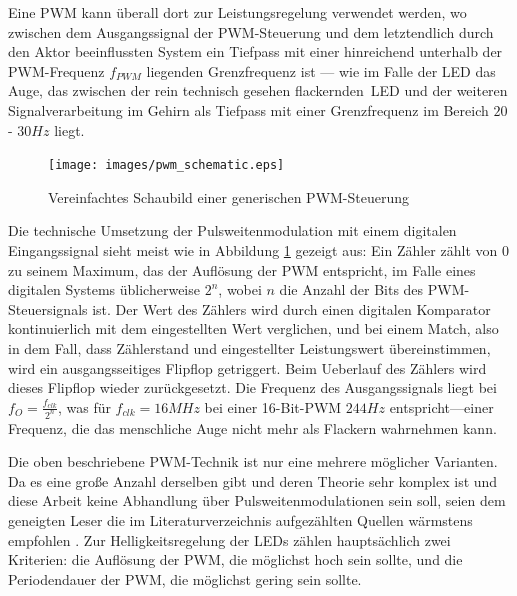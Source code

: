 \documentclass[12pt,a4paper,notitlepage]{article}
\begin{document}
Eine \gls{PWM} kann überall dort zur Leistungsregelung verwendet werden, wo zwischen dem Ausgangssignal der \gls{PWM}-Steuerung und dem letztendlich durch den Aktor beeinflussten System ein Tiefpass mit einer hinreichend unterhalb der PWM-Frequenz $f_{PWM}$ liegenden Grenzfrequenz ist --- wie im Falle der \gls{LED} das Auge, das zwischen der rein technisch gesehen \glqq flackernden\grqq\ \gls{LED} und der weiteren Signalverarbeitung im Gehirn als Tiefpass mit einer Grenzfrequenz im Bereich $20$ - $30Hz$ liegt.

\begin{figure}
\centering
\texttt{[image: images/pwm\_schematic.eps]}
\caption{Vereinfachtes Schaubild einer generischen PWM-Steuerung}
\label{pwm_schematic}
\end{figure}

Die technische Umsetzung der Pulsweitenmodulation mit einem digitalen Eingangssignal sieht meist wie in Abbildung \ref{pwm_schematic}
gezeigt aus: Ein Zähler zählt von 0 zu seinem Maximum, das der Auflösung der \gls{PWM} entspricht, im Falle eines digitalen Systems üblicherweise $2^n$, wobei $n$ die Anzahl der Bits des \gls{PWM}-Steuersignals ist. Der Wert des Zählers wird durch einen digitalen Komparator kontinuierlich mit dem eingestellten Wert verglichen, und bei einem \glqq Match\grqq, also in dem Fall, dass Zählerstand und eingestellter Leistungswert übereinstimmen, wird ein ausgangsseitiges \gls{Flipflop} getriggert. Beim \gls{Ueberlauf} des Zählers wird dieses Flipflop wieder zurückgesetzt. Die Frequenz des Ausgangssignals liegt bei $f_O=\frac{f_{clk}}{2^n}$, was für $f_{clk}=16MHz$ bei einer 16-Bit-PWM $244Hz$ entspricht---einer Frequenz, die das menschliche Auge nicht mehr als Flackern wahrnehmen kann.

Die oben beschriebene \gls{PWM}-Technik ist nur eine mehrere möglicher Varianten. Da es eine große Anzahl derselben gibt und deren Theorie sehr komplex ist und diese Arbeit keine Abhandlung über Pulsweitenmodulationen sein soll, seien dem geneigten Leser die im Literaturverzeichnis aufgezählten Quellen wärmstens empfohlen \cite{ATMEL1, ATMEL2, ATMEL3}. Zur Helligkeitsregelung der LEDs zählen hauptsächlich zwei Kriterien: die Auflösung der PWM, die möglichst hoch sein sollte, und die Periodendauer der PWM, die möglichst gering sein sollte.
\end{document}
